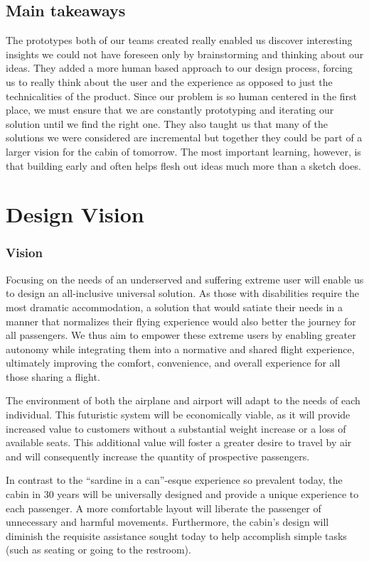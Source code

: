 \documentclass[a4paper, 12pt,conference]{new_cit_thesis}
\begin{document}
\section{Main takeaways}
The prototypes both of our teams created really enabled us discover interesting insights we could not have foreseen only by brainstorming and thinking about our ideas. They added a more human based approach to our design process, forcing us to really think about the user and the experience as opposed to just the technicalities of the product. Since our problem is so human centered in the first place, we must ensure that we are constantly prototyping and iterating our solution until we find the right one. They also taught us that many of the solutions we were considered are incremental but together they could be part of a larger vision for the cabin of tomorrow. The most important learning, however, is that building early and often helps flesh out ideas much more than a sketch does.

\chapter{Design Vision}
\subsection*{Vision}
Focusing on the needs of an underserved and suffering extreme user will enable us to design an all-inclusive universal solution. As those with disabilities require the most dramatic accommodation, a solution that would satiate their needs in a manner that normalizes their flying experience would also better the journey for all passengers. We thus aim to empower these extreme users by enabling greater autonomy while integrating them into a normative and shared flight experience, ultimately improving the comfort, convenience, and overall experience for all those sharing a flight.

The environment of both the airplane and airport will adapt to the needs of each individual. This futuristic system will be economically viable, as it will provide increased value to customers without a substantial weight increase or a loss of available seats. This additional value will foster a greater desire to travel by air and will consequently increase the quantity of prospective passengers.

In contrast to the “sardine in a can”-esque experience so prevalent today, the cabin in 30 years will be universally designed and provide a unique experience to each passenger. A more comfortable layout will liberate the passenger of unnecessary and harmful movements. Furthermore, the cabin’s design will diminish the requisite assistance sought today to help accomplish simple tasks (such as seating or going to the restroom).
\end{document}
